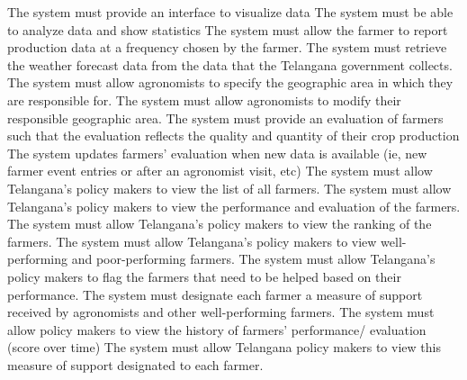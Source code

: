 \begin{itemize}
\begin{itemize}
 The system must provide an interface to visualize data
 The system must be able to analyze data and show statistics
 The system must allow the farmer to report production data at a frequency chosen by the farmer.
 The system must retrieve the weather forecast data from the data that the Telangana government collects.
 The system must allow agronomists to specify the geographic area in which they are responsible for.
 The system must allow agronomists to modify their responsible geographic area.
  The system must provide an evaluation of farmers such that the evaluation reflects the quality and quantity of their crop production
  The system updates farmers' evaluation when new data is available (ie, new farmer event entries or after an agronomist visit, etc)
 The system must allow Telangana’s policy makers to view the list of all farmers.
 The system must allow Telangana’s policy makers to view the performance and evaluation of the farmers.
 The system must allow Telangana’s policy makers to view the ranking of the farmers.
 The system must allow Telangana’s policy makers to view well-performing and poor-performing farmers.
 The system must allow Telangana’s policy makers to flag the farmers that need to be helped based on their performance.
 The system must designate each farmer a measure of support received by agronomists and other well-performing farmers.
 The system must allow policy makers to view the history of farmers’ performance/ evaluation (score over time)
 The system must allow Telangana policy makers to view this measure of support designated to each farmer.
\end{itemize}



\end{itemize}
